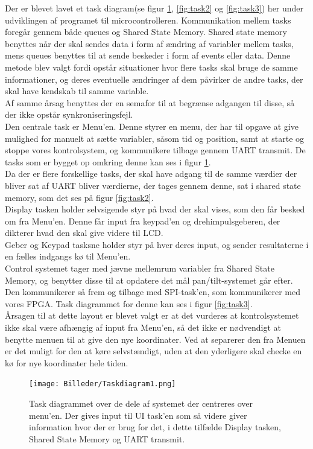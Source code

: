 Der er blevet lavet et task diagram(se figur \ref{fig:task1}, \ref{fig:task2} og \ref{fig:task3}) her under udviklingen af programet til microcontrolleren. Kommunikation mellem tasks foregår gennem både queues og Shared State Memory. Shared state memory benyttes når der skal sendes data i form af ændring af variabler mellem tasks, mens queues benyttes til at sende beskeder i form af events eller data. Denne metode blev valgt fordi opstår situationer hvor flere tasks skal bruge de samme informationer, og deres eventuelle ændringer af dem påvirker de andre tasks, der skal have kendskab til samme variable.
\\
Af samme årsag benyttes der en semafor til at begrænse adgangen til disse, så der ikke opstår synkroniseringsfejl.
\\
Den centrale task er Menu'en. Denne styrer en menu, der har til opgave at give mulighed for manuelt at sætte variabler, såsom tid og position, samt at starte og stoppe vores kontrolsystem, og kommunikere tilbage gennem UART transmit. De tasks som er bygget op omkring denne kan ses i figur \ref{fig:task1}.
\\
Da der er flere forskellige tasks, der skal have adgang til de samme værdier der bliver sat af UART bliver værdierne, der tages gennem denne, sat i shared state memory, som det ses på figur \ref{fig:task2}.
\\
Display tasken holder selvsigende styr på hvad der skal vises, som den får besked om fra Menu'en. Denne får input fra keypad'en og drehimpulsgeberen, der dikterer hvad den skal give videre til LCD.
\\
Geber og Keypad tasksne holder styr på hver deres input, og sender resultaterne i en fælles indgangs kø til Menu'en.
\\
Control systemet tager med jævne mellemrum variabler fra Shared State Memory, og benytter disse til at opdatere det mål pan/tilt-systemet går efter. Den kommunikerer så frem og tilbage med SPI-task'en, som kommunikerer med vores FPGA. Task diagrammet for denne kan ses i figur \ref{fig:task3}.
\\
Årsagen til at dette layout er blevet valgt er at det vurderes at kontrolsystemet ikke skal være afhængig af input fra Menu'en, så det ikke er nødvendigt at benytte menuen til at give den nye koordinater. Ved at separerer den fra Menuen er det muligt for den at køre selvstændigt, uden at den yderligere skal checke en kø for nye koordinater hele tiden.

\begin{figure}[ht]
			\begin{center}
	\texttt{[image: Billeder/Taskdiagram1.png]}
			\end{center}
	\caption{Task diagrammet over de dele af systemet der centreres over menu'en. Der gives input til UI task'en som så videre giver information hvor der er brug for det, i dette tilfælde Display tasken, Shared State Memory og UART transmit.}
	\label{fig:task1}
\end{figure}

